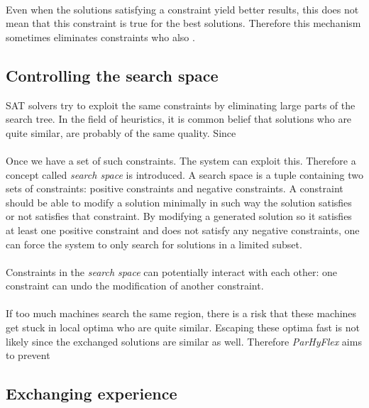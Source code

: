 \documentclass[a4paper,10pt]{article}
\newcommand{\seclab}[1]{\label{sec:#1}}
\begin{document}
\paragraph{}
Even when the solutions satisfying a constraint yield better results, this does not mean that this constraint is true for the best solutions. Therefore this mechanism sometimes eliminates constraints who also .

\subsection{Controlling the search space}
\seclab{controllingsearchspace}
SAT solvers try to exploit the same constraints by eliminating large parts of the search tree. In the field of heuristics, it is common belief that solutions who are quite similar, are probably of the same quality. Since
\paragraph{}
Once we have a set of such constraints. The system can exploit this. Therefore a concept called \emph{search space} is introduced. A search space is a tuple containing two sets of constraints: positive constraints and negative constraints. A constraint should be able to modify a solution minimally in such way the solution satisfies or not satisfies that constraint. By modifying a generated solution so it satisfies at least one positive constraint and does not satisfy any negative constraints, one can force the system to only search for solutions in a limited subset.
\paragraph{}
Constraints in the \emph{search space} can potentially interact with each other: one constraint can undo the modification of another constraint.
\paragraph{}
If too much machines search the same region, there is a risk that these machines get stuck in local optima who are quite similar. Escaping these optima fast is not likely since the exchanged solutions are similar as well. Therefore \emph{ParHyFlex} aims to prevent 

\subsection{Exchanging experience}
\seclab{exchangingexperience}
\end{document}
